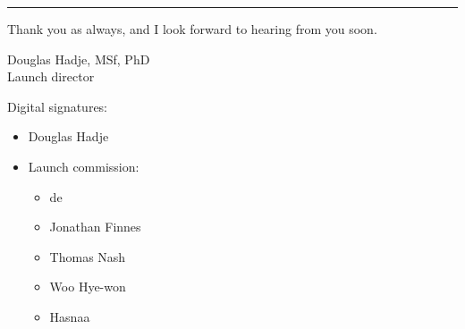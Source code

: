 \begin{center}\rule{0.5\linewidth}{0.5pt}\end{center}

Thank you as always, and I look forward to hearing from you soon.

Douglas Hadje, MSf, PhD\\
Launch director

Digital signatures:

\begin{itemize}
\tightlist
\item
  Douglas Hadje
\item
  Launch commission:

  \begin{itemize}
  \tightlist
  \item
    de
  \item
    Jonathan Finnes
  \item
    Thomas Nash
  \item
    Woo Hye-won
  \item
    Hasnaa
  \end{itemize}
\end{itemize}
